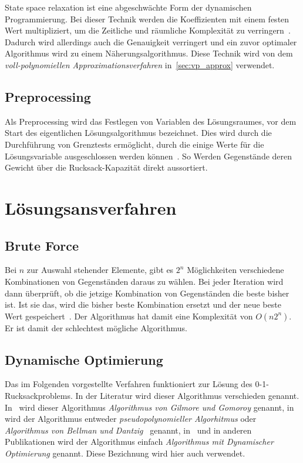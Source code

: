 \documentclass[12pt, a4paper, ngerman]{article}
\begin{document}
State space relaxation ist eine abgeschwächte Form der dynamischen Programmierung.
Bei dieser Technik werden die Koeffizienten mit einem festen Wert multipliziert,
um die Zeitliche und räumliche Komplexität zu verringern~\cite{algos_knapsack}.
Dadurch wird allerdings auch die Genauigkeit verringert
und ein zuvor optimaler Algorithmus wird zu einem Näherungsalgorithmus.
Diese Technik wird von dem \emph{voll-polynomiellen Approximationsverfahren} in~\ref{sec:vp_approx} verwendet.

\subsection{Preprocessing}

Als Preprocessing wird das Festlegen von Variablen des Lösungsraumes,
vor dem Start des eigentlichen Lösungsalgorithmus bezeichnet.
Dies wird durch die Durchführung von Grenztests ermöglicht,
durch die einige Werte für die Lösungsvariable ausgeschlossen werden können~\cite{algos_knapsack}.
So Werden Gegenstände deren Gewicht über die Rucksack-Kapazität direkt aussortiert.

\section{Lösungsansverfahren}
\label{sec:loesung}

\subsection{Brute Force}

Bei \(n\) zur Auswahl stehender Elemente, gibt es \(2^n\) Möglichkeiten verschiedene Kombinationen von Gegenständen daraus zu wählen.
Bei jeder Iteration wird dann überprüft,
ob die jetzige Kombination von Gegenständen die beste bisher ist.
Ist sie das, wird die bisher beste Kombination ersetzt und der neue beste Wert gespeichert~\cite{paper102}.
Der Algorithmus hat damit eine Komplexität von \(O(n2^n)\).
Er ist damit der schlechtest mögliche Algorithmus.

\subsection{Dynamische Optimierung}
\label{sec:dyn_opt}

Das im Folgenden vorgestellte Verfahren funktioniert zur Lösung des 0-1-Rucksackproblems.
In der Literatur wird dieser Algorithmus verschieden genannt.
In~\cite{scheiterhauer2008} wird dieser Algorithmus \emph{Algorithmus von Gilmore und Gomoroy} genannt,
in~\cite{KombinatorischeOptimierung} wird der Algorithmus entweder \emph{pseudopolynomieller Algorhitmus} oder
\emph{Algorithmus von Bellman und Dantzig}~\cite{KombinatorischeOptimierung} genannt,
in~\cite{paper102,intro_survey} und in anderen Publikationen wird der Algorithmus einfach
\emph{Algorithmus mit Dynamischer Optimierung} genannt.
Diese Bezichnung wird hier auch verwendet.
\end{document}

